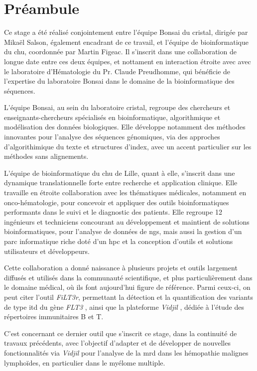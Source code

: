 \chapter{Préambule}

Ce stage a été réalisé conjointement entre l'équipe Bonsai du \gls{cristal}, 
dirigée par Mikaël Salson, également encadrant de ce travail, 
et l'équipe de bioinformatique du \gls{chu}, coordonnée par Martin Figeac. 
Il s'inscrit dans une collaboration de longue date entre ces deux équipes, 
et nottament en interaction étroite avec avec le laboratoire d'Hématologie du Pr. Claude Preudhomme, 
qui bénéficie de l'expertise du laboratoire Bonsai dans le domaine de la bioinformatique 
des séquences.

\vspace{1em}

L'équipe Bonsai, au sein du laboratoire \gls{cristal}, regroupe des chercheurs et enseignants-chercheurs
spécialisés en bioinformatique, algorithmique et modélisation des données biologiques. 
Elle développe notamment des méthodes innovantes pour l'analyse des séquences génomiques, 
via des approches d'algorithimique du texte et structures d'index, avec un accent particulier 
sur les méthodes sans alignements. 

\vspace{1em}

L'équipe de bioinformatique du \gls{chu} de Lille, quant à elle, 
s'inscrit dans une dynamique translationnelle forte entre recherche et application clinique. 
Elle travaille en étroite collaboration avec les thématiques médicales, notamment en onco-hématologie, 
pour concevoir et appliquer des outils bioinformatiques performants dans le suivi et le diagnostic des patients.
Elle regroupe 12 ingénieurs et techniciens concourant au développement et maintient de solutions bioinformatiques,
pour l'analyse de données de \gls{ngs}, mais aussi la gestion d'un parc informatique riche doté 
d'un \gls{hpc} et la conception d'outils et solutions utilisateurs et développeurs.

\vspace{1em}

Cette collaboration a donné naissance à plusieurs projets et outils 
largement diffusés et utilisés dans la communauté scientifique, 
et plus particulièrement dans le domaine médical, où ils font aujourd'hui figure de référence. 
Parmi ceux-ci, on peut citer l'outil \textit{FiLT3r}, permettant la détection 
et la quantification des variants de type \gls{itd} du gène \textit{FLT3} \cite{boudryFrugalAlignmentfreeIdentification2022}, 
ainsi que la plateforme \textit{Vidjil} \cite{duezVidjilWebPlatform2016}, dédiée à l'étude des répertoires immunitaires B et T.

\vspace{1em}

C'est concernant ce dernier outil que s'inscrit ce stage, dans la continuité de travaux précédents,
avec l'objectif d'adapter et de développer de nouvelles fonctionnalités via \textit{Vidjil} 
pour l'analyse de la \gls{mrd} dans les hémopathie malignes lymphoïdes, en particulier dans le myélome multiple.